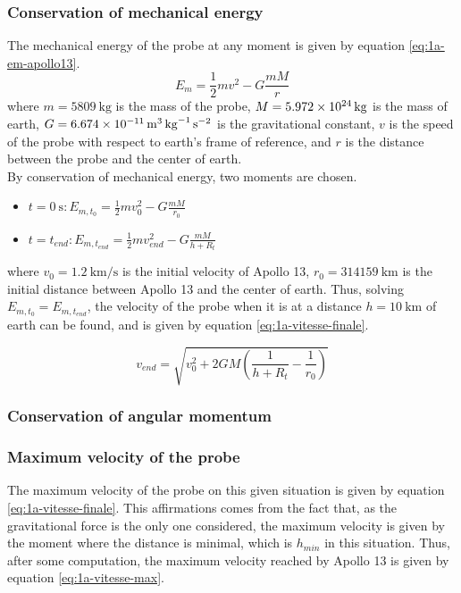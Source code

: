 \documentclass[a4paper,12pt,twoside]{article}
\begin{document}
\subsubsection{Conservation of mechanical energy}
The mechanical energy of the probe at any moment is given by equation \eqref{eq:1a-em-apollo13}.
\begin{equation}
  E_m = \frac{1}{2}mv^2 - G\frac{mM}{r}
  \label{eq:1a-em-apollo13}
\end{equation}
where $m=\SI{5809}{\kilo\gram}$ is the mass of the probe, $M=\SI{5.972d24}{\kilo\gram}$ is the mass of earth, $G=\SI{6.674d-11}{\cubic\meter\per\kilo\gram\per\square\second}$ is the gravitational constant, $v$ is the speed of the probe with respect to earth's frame of reference, and $r$ is the distance between the probe and the center of earth.\\

By conservation of mechanical energy, two moments are chosen.
\begin{itemize}
  \item $t=\SI{0}{\s}: E_{m,t_0} = \frac{1}{2}mv_0^2 - G\frac{mM}{r_0}$
  \item $t=t_{end}: E_{m,t_{end}} = \frac{1}{2}mv_{end}^2 - G\frac{mM}{h + R_t}$
\end{itemize}
where $v_0 = \SI{1.2}{\kilo\meter\per\second}$ is the initial velocity of Apollo 13, $r_0 = \SI{314159}{\kilo\meter}$ is the initial distance between Apollo 13 and the center of earth.
Thus, solving $E_{m,t_0} = E_{m,t_{end}}$, the velocity of the probe when it is at a distance $h=\SI{10}{\kilo\meter}$ of earth can be found, and is given by equation \eqref{eq:1a-vitesse-finale}.

\begin{equation}
  v_{end} = \sqrt{v_0^2 + 2GM\left(\frac{1}{h + R_t} - \frac{1}{r_0}\right)}
  \label{eq:1a-vitesse-finale}
\end{equation}

\subsubsection{Conservation of angular momentum}


\subsubsection{Maximum velocity of the probe}
The maximum velocity of the probe on this given situation is given by equation \eqref{eq:1a-vitesse-finale}.
This affirmations comes from the fact that, as the gravitational force is the only one considered, the maximum velocity is given by the moment where the distance is minimal, which is $h_{min}$ in this situation.
Thus, after some computation, the maximum velocity reached by Apollo 13 is given by equation \eqref{eq:1a-vitesse-max}.
\end{document}
